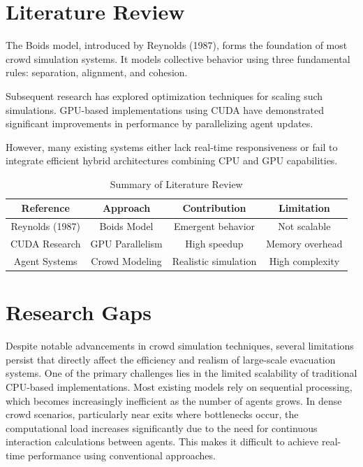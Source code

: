 \documentclass[12pt,a4paper]{report}
\begin{document}
\chapter{Literature Review}

The Boids model, introduced by Reynolds (1987), forms the foundation of most crowd simulation systems. It models collective behavior using three fundamental rules: separation, alignment, and cohesion.

Subsequent research has explored optimization techniques for scaling such simulations. GPU-based implementations using CUDA have demonstrated significant improvements in performance by parallelizing agent updates.

However, many existing systems either lack real-time responsiveness or fail to integrate efficient hybrid architectures combining CPU and GPU capabilities.

\begin{table}[h]
\centering
\caption{Summary of Literature Review}
\begin{tabular}{|c|c|c|c|}
\hline
Reference & Approach & Contribution & Limitation \\
\hline
Reynolds (1987) & Boids Model & Emergent behavior & Not scalable \\
\hline
CUDA Research & GPU Parallelism & High speedup & Memory overhead \\
\hline
Agent Systems & Crowd Modeling & Realistic simulation & High complexity \\
\hline
\end{tabular}
\end{table}

\chapter{Research Gaps}

Despite notable advancements in crowd simulation techniques, several limitations persist that directly affect the efficiency and realism of large-scale evacuation systems. One of the primary challenges lies in the limited scalability of traditional CPU-based implementations. Most existing models rely on sequential processing, which becomes increasingly inefficient as the number of agents grows. In dense crowd scenarios, particularly near exits where bottlenecks occur, the computational load increases significantly due to the need for continuous interaction calculations between agents. This makes it difficult to achieve real-time performance using conventional approaches.
\end{document}
